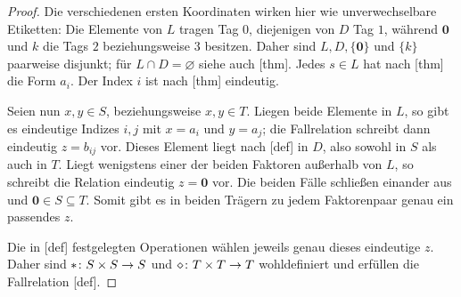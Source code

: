 \documentclass[main.tex]{subfiles}
\begin{document}
\begin{proof}
Die verschiedenen ersten Koordinaten wirken hier wie unverwechselbare
Etiketten: Die Elemente von \(L\) tragen Tag \(0\), diejenigen von \(D\)
Tag \(1\), während \(\mathbf0\) und \(k\) die Tags \(2\) beziehungsweise
\(3\) besitzen. Daher sind \(L,D,\{\mathbf0\}\) und \(\{k\}\) paarweise
disjunkt; für \(L\cap D=\varnothing\) siehe auch
[thm]. Jedes \(s\in L\) hat
nach [thm] die Form \(a_i\).
Der Index \(i\) ist nach
[thm] eindeutig.

Seien nun \(x,y\in S\), beziehungsweise \(x,y\in T\). Liegen beide
Elemente in \(L\), so gibt es eindeutige Indizes \(i,j\) mit
\(x=a_i\) und \(y=a_j\); die Fallrelation schreibt dann eindeutig
\(z=b_{ij}\) vor. Dieses Element liegt nach
[def] in \(D\), also sowohl in
\(S\) als auch in \(T\). Liegt wenigstens einer der beiden Faktoren
außerhalb von \(L\), so schreibt die Relation eindeutig \(z=\mathbf0\)
vor. Die beiden Fälle schließen einander aus und
\(\mathbf0\in S\subseteq T\). Somit gibt es in beiden Trägern zu jedem
Faktorenpaar genau ein passendes \(z\).

Die in [def] festgelegten Operationen
wählen jeweils genau dieses eindeutige \(z\). Daher sind
\(\mathbin{\ast}\colon S\times S\to S\) und
\(\mathbin{\diamond}\colon T\times T\to T\) wohldefiniert und erfüllen die
Fallrelation [def].
\end{proof}
\end{document}
